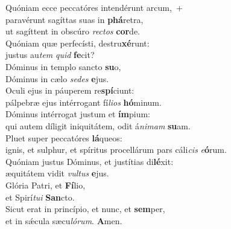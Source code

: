 \evenverse Quóniam ecce peccatóres intendérunt arcum,~+\\\evenverse  paravérunt sagíttas suas in \textbf{phá}retra,~\*\\
\evenverse ut sagíttent in obscúro \textit{re}\textit{ctos} \textbf{cor}de.\\
\oddverse Quóniam quæ perfecísti, destru\textbf{xé}runt:~\*\\
\oddverse justus au\textit{tem} \textit{quid} \textbf{fe}cit?\\
\evenverse Dóminus in templo sancto \textbf{su}o,~\*\\
\evenverse Dóminus in cælo \textit{se}\textit{des} \textbf{e}jus.\\
\oddverse Oculi ejus in páuperem re\textbf{spí}ciunt:~\*\\
\oddverse pálpebræ ejus intérrogant fí\textit{li}\textit{os} \textbf{hó}minum.\\
\evenverse Dóminus intérrogat justum et \textbf{ím}pium:~\*\\
\evenverse qui autem díligit iniquitátem, odit á\textit{ni}\textit{mam} \textbf{su}am.\\
\oddverse Pluet super peccatóres \textbf{lá}queos:~\*\\
\oddverse ignis, et sulphur, et spíritus procellárum pars cáli\textit{cis} \textit{e}\textbf{ó}rum.\\
\evenverse Quóniam justus Dóminus, et justítias di\textbf{lé}xit:~\*\\
\evenverse æquitátem vidit \textit{vul}\textit{tus} \textbf{e}jus.\\
\oddverse Glória Patri, et \textbf{Fí}lio,~\*\\
\oddverse et Spirí\textit{tu}\textit{i} \textbf{San}cto.\\
\evenverse Sicut erat in princípio, et nunc, et \textbf{sem}per,~\*\\
\evenverse et in sǽcula sæcu\textit{ló}\textit{rum}. \textbf{A}men.\\
